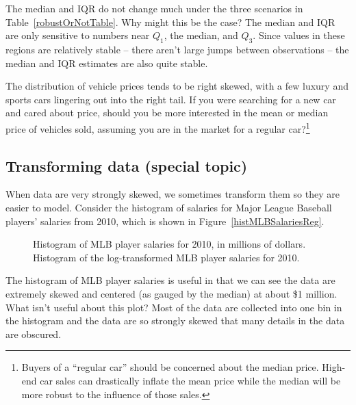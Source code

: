 \begin{example}{The median and IQR do not change much under the three scenarios in Table~\ref{robustOrNotTable}. Why might this be the case?}
The median and IQR are only sensitive to numbers near $Q_1$, the median, and $Q_3$. Since values in these regions are relatively stable -- there aren't large jumps between observations -- the median and IQR estimates are also quite stable.
\end{example}

\begin{exercise}
The distribution of vehicle prices tends to be right skewed, with a few luxury and sports cars lingering out into the right tail. If you were searching for a new car and cared about price, should you be more interested in the mean or median price of vehicles sold, assuming you are in the market for a regular car?\footnote{Buyers of a ``regular car'' should be concerned about the median price. High-end car sales can drastically inflate the mean price while the median will be more robust to the influence of those sales.}
\end{exercise}

\subsection{Transforming data (special topic)}
\label{transformingDataSubsection}

When data are very strongly skewed, we sometimes transform them so they are easier to model. Consider the histogram of salaries for Major League Baseball players' salaries from 2010, which is shown in Figure~\ref{histMLBSalariesReg}.

\begin{figure}[ht]
\centering
{}
\caption{ Histogram of MLB player salaries for 2010, in millions of dollars.  Histogram of the log-transformed MLB player salaries for 2010.}
\label{histMLBSalaries}
\end{figure}

\begin{example}{The histogram of MLB player salaries is useful in that we can see the data are extremely skewed and centered (as gauged by the median) at about \$1 million. What isn't useful about this plot?}
Most of the data are collected into one bin in the histogram and the data are so strongly skewed that many details in the data are obscured.
\end{example}

